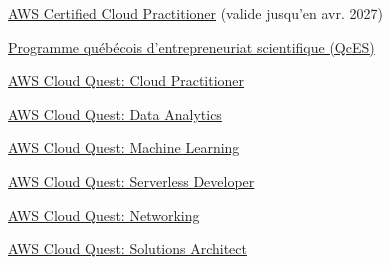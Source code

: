 
\begin{cvitems}
  \item {\href{https://www.credly.com/badges/b57717b2-640e-459b-be04-6de7062b1564}{AWS Certified Cloud Practitioner} (valide jusqu'en avr. 2027)}
  \item {\href{https://verified.sertifier.com/fr/verify/37471918795197/}{Programme québécois d'entrepreneuriat scientifique (QcES)}}
  \item {\href{https://www.credly.com/badges/5f355856-1c00-4322-87db-b79af4919f54}{AWS Cloud Quest: Cloud Practitioner}}
  \item {\href{https://www.credly.com/badges/53058a73-f07d-4773-8a8c-4c6067bac2a7}{AWS Cloud Quest: Data Analytics}}
  \item {\href{https://www.credly.com/badges/85e788b1-b632-4396-8b21-2bc651eb43ea}{AWS Cloud Quest: Machine Learning}}
  \item {\href{https://www.credly.com/badges/3d3e6765-8c1b-4935-ae11-4cdf9ec780b8}{AWS Cloud Quest: Serverless Developer}}
  \item {\href{https://www.credly.com/badges/3c080879-5c3b-46d2-9f77-6479ece661f5}{AWS Cloud Quest: Networking}}
  \item {\href{https://www.credly.com/badges/a71d6cf3-b1ed-414f-855f-4a79d516e171}{AWS Cloud Quest: Solutions Architect}}
\end{cvitems}
